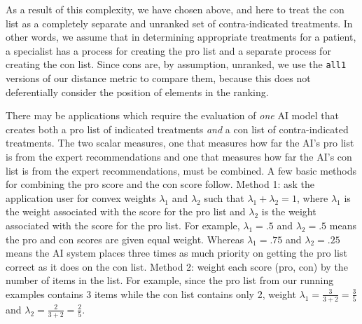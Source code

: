 \documentclass{article}
\begin{document}
As a result of this complexity, we have chosen above, and here to treat the con list as a completely separate and unranked set of contra-indicated treatments. In other words, we assume that in determining appropriate treatments for a patient, a specialist has a process for creating the pro list and a separate process for creating the con list. Since cons are, by assumption, unranked, we use the \texttt{all1} versions of our distance metric to compare them, because this does not deferentially consider the position of elements in the ranking.

There may be applications which require the evaluation of \emph{one} AI model that creates both a pro list of indicated treatments \emph{and} a con list of contra-indicated treatments. The two scalar measures, one that measures how far the AI's pro list is from the expert recommendations and one that measures how far the AI's con list is from the expert recommendations, must be combined. A few basic methods for combining the pro score and the con score follow. Method 1: ask the application user for convex weights $\lambda_1$ and $\lambda_2$ such that $\lambda_1 + \lambda_2 = 1$, where $\lambda_1$ is the weight associated with the score for the pro list and $\lambda_2$ is the weight associated with the score for the pro list. For example, $\lambda_1=.5$ and $\lambda_2=.5$ means the pro and con scores are given equal weight. Whereas $\lambda_1=.75$ and $\lambda_2=.25$ means the AI system places three times as much priority on getting the pro list correct as it does on the con list.  Method 2: weight each score (pro, con) by the number of items in the list. For example, since the pro list from our running examples contains 3 items while the con list contains only 2, weight $\lambda_1=\frac{3}{3+2}=\frac{3}{5}$ and $\lambda_2=\frac{2}{3+2}=\frac{2}{5}$.
\end{document}
